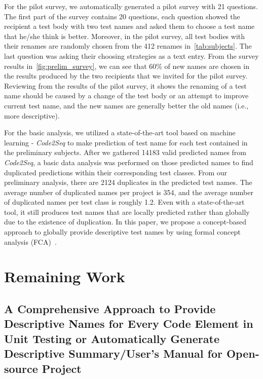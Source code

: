 \documentclass{article}
\begin{document}
For the pilot survey, we automatically generated a pilot survey with 21 questions.
%
The first part of the survey contains 20 questions, each question showed the recipient a test body with two test names and asked them to choose a test name that he/she think is better.
%
Moreover, in the pilot survey, all test bodies with their renames are randomly chosen from the \num{412} renames in~\cref{tab:subjects}.
%
The last question was asking their choosing strategies as a text entry.
%
From the survey results in~\cref{fig:prelim_survey}, we can see that \num{60}\% of new names are chosen in the results produced by the two recipients that we invited for the pilot survey.
%
Reviewing from the results of the pilot survey, it shows the renaming of a test name should be caused by a change of the test body or an attempt to improve current test name, and the new names are generally better the old names (i.e., more descriptive).


For the basic analysis, we utilized a state-of-the-art tool based on machine learning - \textit{Code2Seq} to make prediction of test name for each test contained in the preliminary subjects.
%
After we gathered \num{14183} valid predicted names from \textit{Code2Seq}, a basic data analysis was performed on those predicted names to find duplicated predictions within their corresponding test classes.
%
From our preliminary analysis, there are \num{2124} duplicates in the predicted test names.
%
The average number of duplicated names per project is \num{354}, and the average number of duplicated names per test class is roughly \num{1.2}.
%
Even with a state-of-the-art tool, it still produces test names that are locally predicted rather than globally due to the existence of duplication.
%
In this paper, we propose a concept-based approach to globally provide descriptive test names by using formal concept analysis (FCA)~\cite{tonella2004formal}.



\section{Remaining Work}

    
\subsection{A Comprehensive Approach to Provide Descriptive Names for Every Code Element in Unit Testing or Automatically Generate Descriptive Summary\slash User's Manual for Open-source Project}
\end{document}
